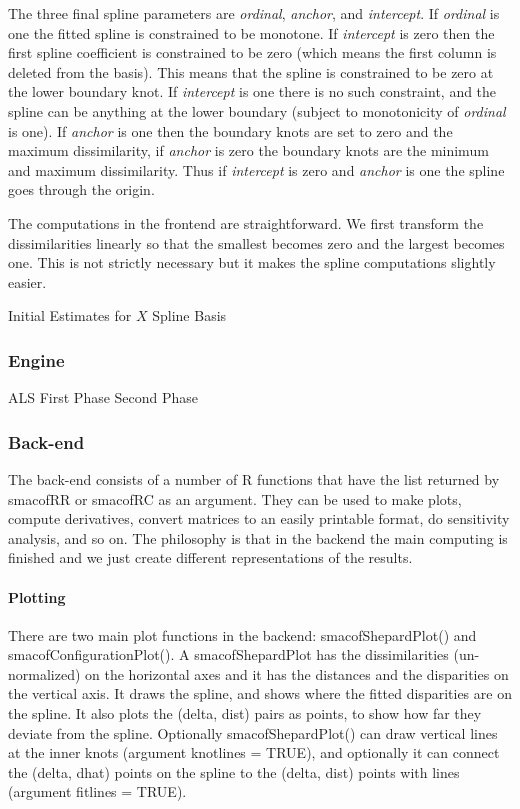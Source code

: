 \documentclass[
  12pt,
]{article}
\begin{document}
The three final spline parameters are \emph{ordinal}, \emph{anchor}, and \emph{intercept}. If \emph{ordinal} is one the fitted spline is constrained to be monotone. If \emph{intercept} is zero then the first spline coefficient is constrained to be zero (which
means the first column is deleted from the basis). This means that the spline
is constrained to be zero at the lower boundary knot. If \emph{intercept} is one
there is no such constraint, and the spline can be anything at the lower boundary
(subject to monotonicity of \emph{ordinal} is one). If \emph{anchor} is one then the
boundary knots are set to zero and the maximum dissimilarity, if \emph{anchor} is
zero the boundary knots are the minimum and maximum dissimilarity. Thus if \emph{intercept} is zero and \emph{anchor} is one the spline goes through the origin.

The computations in the frontend are straightforward. We first transform
the dissimilarities linearly so that the smallest becomes zero and the
largest becomes one. This is not strictly necessary but it makes the
spline computations slightly easier.

Initial Estimates for \(X\) Spline Basis

\subsubsection{Engine}\label{engine}

ALS First Phase Second Phase

\subsubsection{Back-end}\label{back-end}

The back-end consists of a number of R functions that have the list
returned by smacofRR or smacofRC as an argument. They can be used to
make plots, compute derivatives, convert matrices to an easily
printable format, do sensitivity analysis, and so on. The philosophy
is that in the backend the main computing is finished and we
just create different representations of the results.

\paragraph{Plotting}\label{plotting}

There are two main plot functions in the backend: smacofShepardPlot()
and smacofConfigurationPlot(). A smacofShepardPlot has the
dissimilarities (un-normalized) on the horizontal axes and
it has the distances and the disparities on the vertical axis.
It draws the spline, and shows where the fitted disparities are
on the spline. It also plots the (delta, dist) pairs as points,
to show how far they deviate from the spline. Optionally
smacofShepardPlot() can draw vertical lines at the inner knots
(argument knotlines = TRUE), and optionally it can connect
the (delta, dhat) points on the spline to the (delta, dist)
points with lines (argument fitlines = TRUE).
\end{document}
